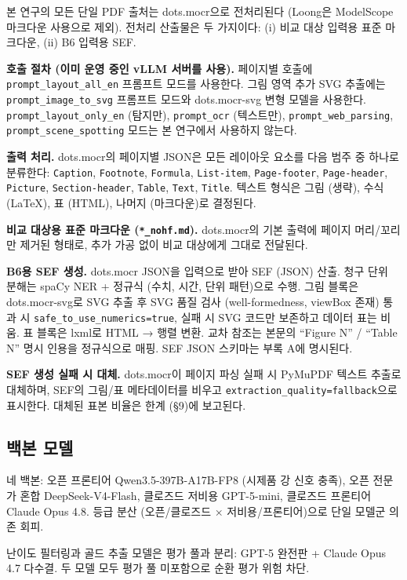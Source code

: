 \documentclass[11pt]{article}
\begin{document}
본 연구의 모든 단일 PDF 출처는 dots.mocr으로 전처리된다 (Loong은 ModelScope 마크다운 사용으로 제외). 전처리 산출물은 두 가지이다: (i) 비교 대상 입력용 표준 마크다운, (ii) B6 입력용 SEF.

\textbf{호출 절차 (이미 운영 중인 vLLM 서버를 사용).} 페이지별 호출에 \texttt{prompt\_layout\_all\_en} 프롬프트 모드를 사용한다. 그림 영역 추가 SVG 추출에는 \texttt{prompt\_image\_to\_svg} 프롬프트 모드와 dots.mocr-svg 변형 모델을 사용한다. \texttt{prompt\_layout\_only\_en} (탐지만), \texttt{prompt\_ocr} (텍스트만), \texttt{prompt\_web\_parsing}, \texttt{prompt\_scene\_spotting} 모드는 본 연구에서 사용하지 않는다.

\textbf{출력 처리.} dots.mocr의 페이지별 JSON은 모든 레이아웃 요소를 다음 범주 중 하나로 분류한다: \texttt{Caption}, \texttt{Footnote}, \texttt{Formula}, \texttt{List-item}, \texttt{Page-footer}, \texttt{Page-header}, \texttt{Picture}, \texttt{Section-header}, \texttt{Table}, \texttt{Text}, \texttt{Title}. 텍스트 형식은 그림 (생략), 수식 (LaTeX), 표 (HTML), 나머지 (마크다운)로 결정된다.

\textbf{비교 대상용 표준 마크다운 (\texttt{*\_nohf.md}).} dots.mocr의 기본 출력에 페이지 머리/꼬리만 제거된 형태로, 추가 가공 없이 비교 대상에게 그대로 전달된다.

\textbf{B6용 SEF 생성.} dots.mocr JSON을 입력으로 받아 SEF (JSON) 산출. 청구 단위 분해는 spaCy NER + 정규식 (수치, 시간, 단위 패턴)으로 수행. 그림 블록은 dots.mocr-svg로 SVG 추출 후 SVG 품질 검사 (well-formedness, viewBox 존재) 통과 시 \texttt{safe\_to\_use\_numerics=true}, 실패 시 SVG 코드만 보존하고 데이터 표는 비움. 표 블록은 lxml로 HTML → 행렬 변환. 교차 참조는 본문의 ``Figure N'' / ``Table N'' 명시 인용을 정규식으로 매핑. SEF JSON 스키마는 부록 A에 명시된다.

\textbf{SEF 생성 실패 시 대체.} dots.mocr이 페이지 파싱 실패 시 PyMuPDF 텍스트 추출로 대체하며, SEF의 그림/표 메타데이터를 비우고 \texttt{extraction\_quality=fallback}으로 표시한다. 대체된 표본 비율은 한계 (\S 9)에 보고된다.

\subsection{백본 모델}

네 백본: 오픈 프론티어 Qwen3.5-397B-A17B-FP8 (시제품 강 신호 충족), 오픈 전문가 혼합 DeepSeek-V4-Flash, 클로즈드 저비용 GPT-5-mini, 클로즈드 프론티어 Claude Opus 4.8. 등급 분산 (오픈/클로즈드 × 저비용/프론티어)으로 단일 모델군 의존 회피.

난이도 필터링과 골드 추출 모델은 평가 풀과 분리: GPT-5 완전판 + Claude Opus 4.7 다수결. 두 모델 모두 평가 풀 미포함으로 순환 평가 위험 차단.
\end{document}
